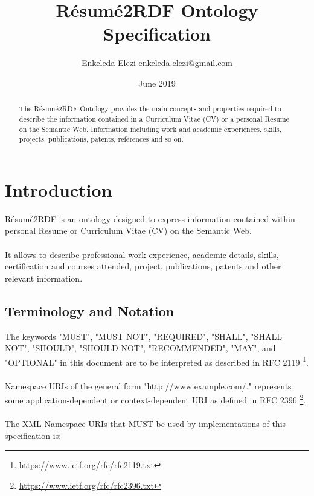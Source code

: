 \documentclass[a4paper,12pt]{article}
\title{R{\'e}sum{\'e}2RDF Ontology Specification}
\author{Enkeleda Elezi enkeleda.elezi@gmail.com}
\date{June 2019}
\numberwithin{equation}{section}
\begin{document}
\maketitle

\begin{abstract}
 The R{\'e}sum{\'e}2RDF Ontology provides the main concepts and properties required to describe the information contained in a Curriculum Vitae (CV) or a personal Resume on the Semantic Web. Information including work and academic experiences, skills, projects, publications, patents, references and so on.
\end{abstract}

\tableofcontents\newpage{}

\section{Introduction}\label{introduction}
R{\'e}sum{\'e}2RDF is an ontology designed to express information contained within personal Resume or Curriculum Vitae (CV) on the Semantic Web.
\\\\
It allows to describe professional work experience, academic details, skills, certification and courses attended, project, publications, patents and other relevant information.

\subsection{Terminology and Notation}
The keywords "MUST", "MUST NOT", "REQUIRED", "SHALL", "SHALL NOT", "SHOULD", "SHOULD NOT", "RECOMMENDED", "MAY", and "OPTIONAL" in this document are to be interpreted as described in RFC 2119 \footnote{\url{https://www.ietf.org/rfc/rfc2119.txt}}.
\\\\
Namespace URIs of the general form "http://www.example.com/." represents some application-dependent or context-dependent URI as defined in RFC 2396 \footnote{\url{https://www.ietf.org/rfc/rfc2396.txt}}.
\\\\
The XML Namespace URIs that MUST be used by implementations of this specification is:
\end{document}
